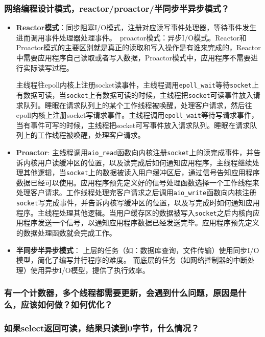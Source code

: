 \documentclass[UTF8,a4paper,8pt]{ctexart}
\begin{document}
		\subsubsection{网络编程设计模式，reactor/proactor/半同步半异步模式？}
			\begin{itemize}
				\item \textbf{Reactor模式}：同步阻塞I/O模式，注册对应读写事件处理器，等待事件发生进而调用事件处理器处理事件。 proactor模式：异步I/O模式。Reactor和Proactor模式的主要区别就是真正的读取和写入操作是有谁来完成的，Reactor中需要应用程序自己读取或者写入数据，Proactor模式中，应用程序不需要进行实际读写过程。
				
				主线程往epoll内核上注册socket读事件，主线程调用\verb|epoll_wait|等待\verb|socket|上有数据可读，当\verb|socket|上有数据可读的时候，主线程把\verb|socket|可读事件放入请求队列。睡眠在请求队列上的某个工作线程被唤醒，处理客户请求，然后往epoll内核上注册socket写请求事件。主线程调用\verb|epoll_wait|等待写请求事件，当有事件可写的时候，主线程把socket可写事件放入请求队列。睡眠在请求队列上的工作线程被唤醒，处理客户请求。
				\item \textbf{Proactor}:
				主线程调用\verb|aio_read|函数向内核注册\verb|socket|上的读完成事件，并告诉内核用户读缓冲区的位置，以及读完成后如何通知应用程序，主线程继续处理其他逻辑，当\verb|socket|上的数据被读入用户缓冲区后，通过信号告知应用程序数据已经可以使用。应用程序预先定义好的信号处理函数选择一个工作线程来处理客户请求。工作线程处理完客户请求之后调用\verb|aio_write|函数向内核注册\verb|socket|写完成事件，并告诉内核写缓冲区的位置，以及写完成时如何通知应用程序。主线程处理其他逻辑。当用户缓存区的数据被写入\verb|socket|之后内核向应用程序发送一个信号，以通知应用程序数据已经发送完毕。应用程序预先定义的数据处理函数就会完成工作。
				
				\item \textbf{半同步半异步模式}：
				上层的任务（如：数据库查询，文件传输）使用同步I/O模型，简化了编写并行程序的难度。
				而底层的任务（如网络控制器的中断处理）使用异步I/O模型，提供了执行效率。
			\end{itemize}
			
		
			
			
		\subsubsection{有一个计数器，多个线程都需要更新，会遇到什么问题，原因是什么，应该如何做？如何优化？}
		
		\subsubsection{如果select返回可读，结果只读到0字节，什么情况？}
		
\end{document}
